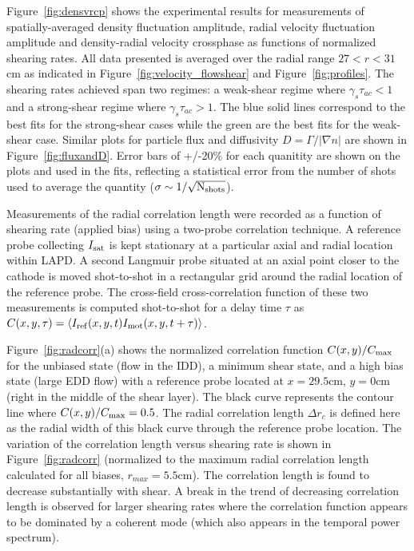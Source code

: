 \documentclass[aip,pop,amsmath,amssymb,preprint,superscriptaddress]{revtex4-1} %
\begin{document}
Figure~\ref{fig:densvrcp} shows the experimental
results for measurements of spatially-averaged density fluctuation amplitude, radial
velocity fluctuation amplitude and density-radial velocity crossphase as functions
of normalized shearing rates. All data presented is averaged over the radial range $27 < r < 31$cm as indicated in Figure~\ref{fig:velocity_flowshear} and Figure~\ref{fig:profiles}. The shearing rates achieved span two
regimes: a weak-shear regime where $\gamma_{s}\tau_{ac} < 1$ and a
strong-shear regime where $\gamma_{s}\tau_{ac} > 1$. The blue solid
lines correspond to the best fits for the strong-shear cases while the
green are the best fits for the weak-shear case.  Similar plots for
particle flux and diffusivity $D = \Gamma/|\nabla n|$ are shown in
Figure~\ref{fig:fluxandD}. Error bars of +/-20\% for each quanitity are
shown on the plots and used in the fits, reflecting a statistical
error from the number of shots used to average the quantity ($\sigma
\sim 1/\sqrt{\rm N_{shots}}$). 

Measurements of the radial correlation length were recorded as a function of shearing rate (applied bias) using a two-probe correlation technique. A reference probe collecting $I_{\rm sat}$ is kept stationary at a particular axial and radial location within LAPD. A second Langmuir probe situated at an axial point closer to the cathode is moved shot-to-shot in a rectangular grid around the radial location of the reference probe.  The cross-field cross-correlation function of these two measurements is computed shot-to-shot for a delay time $\tau$ as $C(x,y,\tau) = \langle I_{\rm ref}(x,y,t)I_{\rm mot}(x,y,t+\tau)\rangle$.

Figure~\ref{fig:radcorr}(a) shows the normalized correlation function $C(x,y)/C_{\rm max}$ for the unbiased state (flow in the IDD), a minimum shear state, and a high bias state (large EDD flow) with a reference probe located at $x=29.5$cm, $y=0$cm (right in the middle of the shear layer). The black curve represents the contour line where $C(x,y)/C_{\rm max} = 0.5$. The radial correlation length $\Delta r_{c}$ is defined here as the radial width of this black curve through the reference probe location.   The variation of the correlation length versus shearing rate is shown in Figure~\ref{fig:radcorr} (normalized to the maximum radial correlation length calculated for all biases, $r_{max} = 5.5$cm).
The correlation length is found to decrease substantially with shear.  A break in the trend of decreasing correlation length is observed for larger shearing rates where the correlation function appears to be dominated by a coherent mode (which also appears in the temporal power spectrum).
\end{document}
